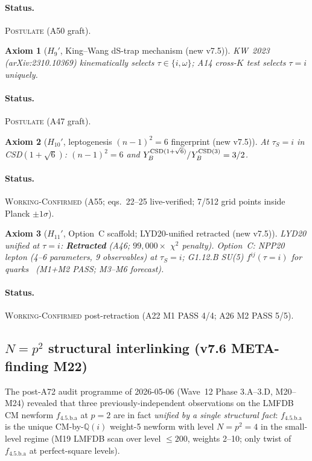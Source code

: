 \documentclass[a4paper,11pt]{article}
\newcommand{\fLM}{f_{\text{4.5.b.a}}}
\newcommand{\Qi}{\mathbb{Q}(i)}
\newtheorem*{axiom*}{Axiom}
\theoremstyle{definition}
\theoremstyle{remark}
\begin{document}
\paragraph{Status.}  \textsc{Postulate} (A50 graft).

\begin{axiom*}[$H_9'$, King--Wang dS-trap mechanism (new v7.5)]
KW~2023~\cite{KW23} (arXiv:2310.10369) kinematically selects
$\tau\in\{i,\omega\}$; A14 cross-$K$ test selects $\tau=i$ uniquely.
\end{axiom*}

\paragraph{Status.}  \textsc{Postulate} (A47 graft).

\begin{axiom*}[$H_{10}'$, leptogenesis $(n-1)^2=6$ fingerprint (new v7.5)]
At $\tau_S=i$ in CSD$(1+\sqrt 6)$: $(n-1)^2=6$ and
$Y_B^{\rm CSD(1+\sqrt 6)}/Y_B^{\rm CSD(3)}=3/2$.
\end{axiom*}

\paragraph{Status.}  \textsc{Working-Confirmed} (A55; \cite{KMSR18}
eqs.~22--25 live-verified; 7/512 grid points inside Planck $\pm1\sigma$).

\begin{axiom*}[$H_{11}'$, Option~C scaffold; LYD20-unified retracted (new v7.5)]
LYD20 unified at $\tau=i$: \textbf{Retracted} (A46;
$99{,}000\times$ $\chi^2$ penalty).
Option~C: NPP20~\cite{NPP20} lepton (4--6 parameters, 9 observables)
at $\tau_S=i$; G1.12.B SU(5) $f^{ij}(\tau=i)$ for
quarks~\cite{A18scoping} (M1+M2 PASS; M3--M6 forecast).
\end{axiom*}

\paragraph{Status.}  \textsc{Working-Confirmed} post-retraction
(A22 M1 PASS 4/4; A26 M2 PASS 5/5).

\subsection{$N=p^{2}$ structural interlinking (v7.6 META-finding M22)}
\label{sec:Npsq-meta}

The post-A72 audit programme of 2026-05-06 (Wave~12 Phase 3.A--3.D,
M20--M24) revealed that three previously-independent observations on
the LMFDB CM newform $\fLM$ at $p=2$ are in fact \emph{unified by a
single structural fact}: $\fLM$ is the unique CM-by-$\Qi$ weight-5
newform with level $N=p^{2}=4$ in the small-level regime
(M19 LMFDB scan over level $\leq 200$, weights 2--10; only twist
of $\fLM$ at perfect-square levels).
\end{document}
